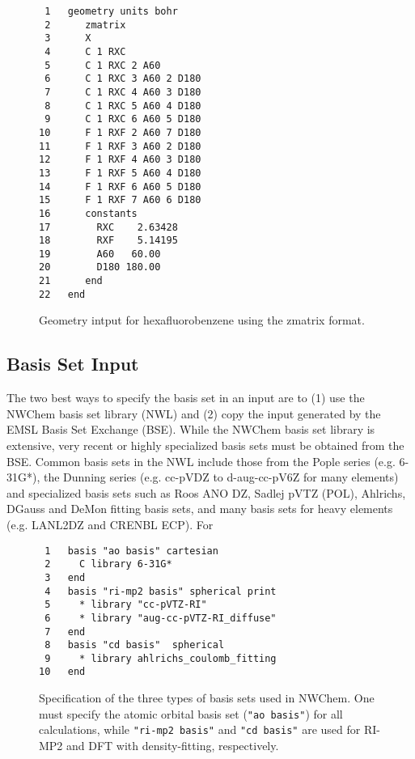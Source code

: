 \documentclass[letterpaper,12pt]{article}
\begin{document}
\begin{figure}
    \caption{Geometry intput for hexafluorobenzene using the zmatrix format.}
    \label{fig:HexafluorobenzeneZMatrix}
    \begin{verbatim}
 1   geometry units bohr
 2      zmatrix
 3      X
 4      C 1 RXC
 5      C 1 RXC 2 A60
 6      C 1 RXC 3 A60 2 D180
 7      C 1 RXC 4 A60 3 D180
 8      C 1 RXC 5 A60 4 D180
 9      C 1 RXC 6 A60 5 D180
10      F 1 RXF 2 A60 7 D180
11      F 1 RXF 3 A60 2 D180
12      F 1 RXF 4 A60 3 D180
13      F 1 RXF 5 A60 4 D180
14      F 1 RXF 6 A60 5 D180
15      F 1 RXF 7 A60 6 D180
16      constants
17        RXC    2.63428
18        RXF    5.14195
19        A60   60.00
20        D180 180.00
21      end
22   end
    \end{verbatim}
\end{figure}

\newpage

\subsection{Basis Set Input}\label{sec:BasisSetInput}

The two best ways to specify the basis set in an input are to (1) use the NWChem basis set library (NWL) and (2) copy the input generated by the EMSL Basis Set Exchange (BSE).  While the NWChem basis set library is extensive, very recent or highly specialized basis sets must be obtained from the BSE.  Common basis sets in the NWL include those from the Pople series (e.g. 6-31G*), the Dunning series (e.g. cc-pVDZ to d-aug-cc-pV6Z for many elements) and specialized basis sets such as Roos ANO DZ, Sadlej pVTZ (POL), Ahlrichs, DGauss and DeMon fitting basis sets, and many basis sets for heavy elements (e.g. LANL2DZ and CRENBL ECP).  For

\begin{figure}
    \caption{Specification of the three types of basis sets used in NWChem.  One must specify the atomic orbital basis set (\texttt{"ao basis"}) for all calculations, while \texttt{"ri-mp2 basis"} and \texttt{"cd basis"} are used for RI-MP2 and DFT with density-fitting, respectively.}
    \label{fig:BasisLibrary}
    \begin{verbatim}
 1   basis "ao basis" cartesian
 2     C library 6-31G*
 3   end
 4   basis "ri-mp2 basis" spherical print
 5     * library "cc-pVTZ-RI"
 6     * library "aug-cc-pVTZ-RI_diffuse"
 7   end
 8   basis "cd basis"  spherical
 9     * library ahlrichs_coulomb_fitting
10   end
    \end{verbatim}
\end{figure}
\end{document}
